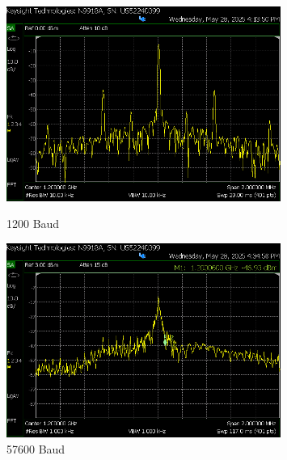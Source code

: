\begin{figure}[H]
    \centering
    \begin{minipage}{0.47\textwidth}
        \centering
        \includegraphics[width=0.8\textwidth]{Pictures/4.4C.1200.png}
        \caption*{1200 Baud}
    \end{minipage}
    \hfill
    \begin{minipage}{0.47\textwidth}
        \centering
        \includegraphics[width=0.8\textwidth]{Pictures/4.4C.57600.png}
        \caption*{57600 Baud}
    \end{minipage}

    \vspace{0.5cm}


\end{figure}
